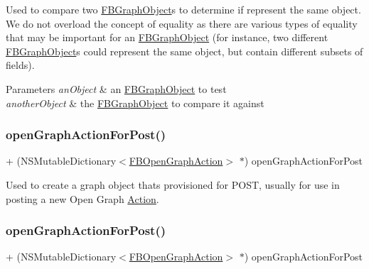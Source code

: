 Used to compare two {\ttfamily \hyperlink{interfaceFBGraphObject}{F\+B\+Graph\+Object}}s to determine if represent the same object. We do not overload the concept of equality as there are various types of equality that may be important for an {\ttfamily \hyperlink{interfaceFBGraphObject}{F\+B\+Graph\+Object}} (for instance, two different {\ttfamily \hyperlink{interfaceFBGraphObject}{F\+B\+Graph\+Object}}s could represent the same object, but contain different subsets of fields).


\begin{DoxyParams}{Parameters}
{\em an\+Object} & an {\ttfamily \hyperlink{interfaceFBGraphObject}{F\+B\+Graph\+Object}} to test\\
\hline
{\em another\+Object} & the {\ttfamily \hyperlink{interfaceFBGraphObject}{F\+B\+Graph\+Object}} to compare it against \\
\hline
\end{DoxyParams}
\mbox{\label{interfaceFBGraphObject_a88f02cdbd7bbafe3c836b9bcd731860d}} 
\subsubsection{\texorpdfstring{open\+Graph\+Action\+For\+Post()}{openGraphActionForPost()}\hspace{0.1cm}{\footnotesize\ttfamily [1/5]}}
{\footnotesize\ttfamily + (N\+S\+Mutable\+Dictionary$<$\hyperlink{protocolFBOpenGraphAction-p}{F\+B\+Open\+Graph\+Action}$>$ $\ast$) open\+Graph\+Action\+For\+Post \begin{DoxyParamCaption}{ }\end{DoxyParamCaption}}

Used to create a graph object that\textquotesingle{}s provisioned for P\+O\+ST, usually for use in posting a new Open Graph \hyperlink{classAction}{Action}. \mbox{\label{interfaceFBGraphObject_a88f02cdbd7bbafe3c836b9bcd731860d}} 
\subsubsection{\texorpdfstring{open\+Graph\+Action\+For\+Post()}{openGraphActionForPost()}\hspace{0.1cm}{\footnotesize\ttfamily [2/5]}}
{\footnotesize\ttfamily + (N\+S\+Mutable\+Dictionary$<$\hyperlink{protocolFBOpenGraphAction-p}{F\+B\+Open\+Graph\+Action}$>$ $\ast$) open\+Graph\+Action\+For\+Post \begin{DoxyParamCaption}{ }\end{DoxyParamCaption}}

